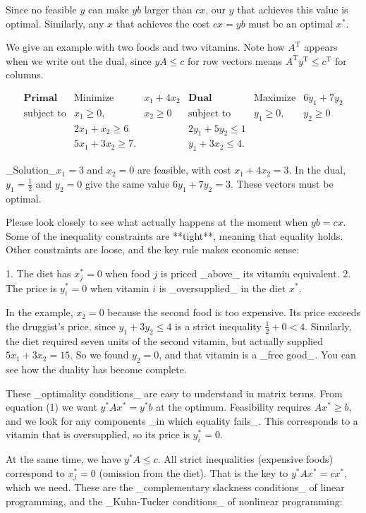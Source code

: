 Since no feasible \(y\) can make \(yb\) larger than \(cx\), our \(y\) that achieves this value is optimal. Similarly, any \(x\) that achieves the cost \(cx=yb\) must be an optimal \(x^{*}\).

We give an example with two foods and two vitamins. Note how \(A^{\mathrm{T}}\) appears when we write out the dual, since \(yA\leq c\) for row vectors means \(A^{\mathrm{T}}y^{\mathrm{T}}\leq c^{\mathrm{T}}\) for columns.

\[\begin{array}{ccccc}\textbf{Primal}&\text{Minimize}&x_{1}+4x_{2}&\textbf{Dual}& \text{Maximize}&6y_{1}+7y_{2}\\ \text{subject to}&x_{1}\geq 0,&x_{2}\geq 0&\text{subject to}&y_{1}\geq 0,&y_{2}\geq 0\\ &2x_{1}+x_{2}\geq 6&\text{}&2y_{1}+5y_{2}\leq 1\\ &5x_{1}+3x_{2}\geq 7.&\text{}&y_{1}+3x_{2}\leq 4.\end{array}\]

_Solution_\(x_{1}=3\) and \(x_{2}=0\) are feasible, with cost \(x_{1}+4x_{2}=3\). In the dual, \(y_{1}=\frac{1}{2}\) and \(y_{2}=0\) give the same value \(6y_{1}+7y_{2}=3\). These vectors must be optimal.

Please look closely to see what actually happens at the moment when \(yb=cx\). Some of the inequality constraints are **tight**, meaning that equality holds. Other constraints are loose, and the key rule makes economic sense:

1. The diet has \(x_{j}^{*}=0\) when food \(j\) is priced _above_ its vitamin equivalent.
2. The price is \(y_{i}^{*}=0\) when vitamin \(i\) is _oversupplied_ in the diet \(x^{*}\).

In the example, \(x_{2}=0\) because the second food is too expensive. Its price exceeds the druggist's price, since \(y_{1}+3y_{2}\leq 4\) is a strict inequality \(\frac{1}{2}+0<4\). Similarly, the diet required seven units of the second vitamin, but actually supplied \(5x_{1}+3x_{2}=15\). So we found \(y_{2}=0\), and that vitamin is a _free good_. You can see how the duality has become complete.

These _optimality conditions_ are easy to understand in matrix terms. From equation (1) we want \(y^{*}Ax^{*}=y^{*}b\) at the optimum. Feasibility requires \(Ax^{*}\geq b\), and we look for any components _in which equality fails_. This corresponds to a vitamin that is oversupplied, so its price is \(y_{i}^{*}=0\).

At the same time, we have \(y^{*}A\leq c\). All strict inequalities (expensive foods) correspond to \(x_{j}^{*}=0\) (omission from the diet). That is the key to \(y^{*}Ax^{*}=cx^{*}\), which we need. These are the _complementary slackness conditions_ of linear programming, and the _Kuhn-Tucker conditions_ of nonlinear programming:

